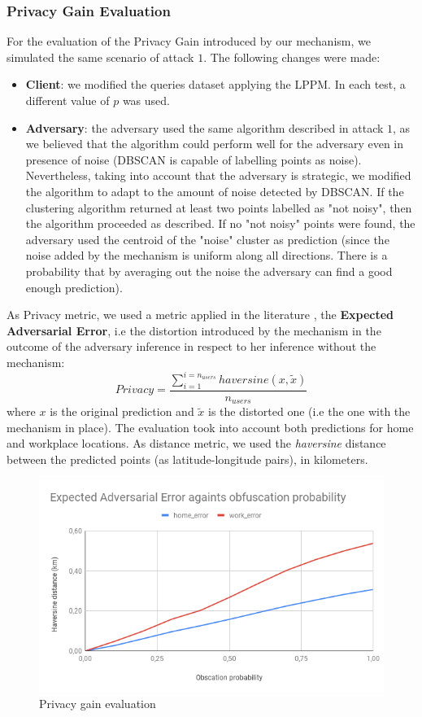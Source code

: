 \documentclass[10pt,conference,compsocconf]{IEEEtran}
\begin{document}
\subsubsection{Privacy Gain Evaluation}
For the evaluation of the Privacy Gain introduced by our mechanism, we simulated
the same scenario of attack $1$. The following changes were made:
\begin{itemize}
    \item \textbf{Client}: we modified the queries dataset applying the LPPM. In
    each test, a different value of $p$ was used.
    \item \textbf{Adversary}: the adversary used the same algorithm described in
    attack $1$, as we believed that the algorithm could perform well for the
    adversary even in presence of noise (DBSCAN is capable of labelling points
    as noise). Nevertheless, taking into account that the adversary is
    strategic, we modified the algorithm to adapt to the amount of noise
    detected by DBSCAN. If the clustering algorithm returned at least two points
    labelled as "not noisy", then the algorithm proceeded as described. If no
    "not noisy" points were found, the adversary used the centroid of the
    "noise" cluster as prediction (since the noise added by the mechanism is
    uniform along all directions. There is a probability that by
    averaging out the noise the adversary can find a good enough prediction).
\end{itemize}
As Privacy metric, we used a metric applied in the literature \cite{Shokri}, the
\textbf{Expected Adversarial Error}, i.e the distortion introduced by the
mechanism in the outcome of the adversary inference in respect to her inference
without the mechanism:
\[Privacy = \frac{\sum_{i=1}^{i=n_{users}}haversine(x, \tilde{x})}{n_{users}}\] where $x$ is the
original prediction and $\tilde{x}$ is the distorted one (i.e the one with the mechanism in place). The evaluation took
into account both predictions for home and workplace locations. As distance
metric, we used the \textit{haversine} distance between the predicted points (as
latitude-longitude pairs), in kilometers.
    \begin{figure}[h!]
        \centering
        \includegraphics[width=0.5\linewidth]{../privacy_evaluation/defence_evaluation/adv_error.png}
        \caption{Privacy gain evaluation}
    \end{figure}
\end{document}
